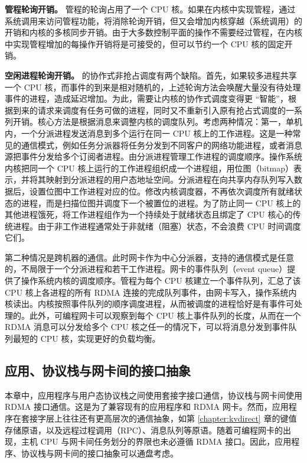 \textbf{管程轮询开销。}
管程的轮询占用了一个 CPU 核。如果在内核中实现管程，通过系统调用来访问管程功能，将消除轮询开销，但又会增加内核穿越（系统调用）的开销和内核的多核同步开销。由于大多数控制平面的操作不需要经过管程，在内核中实现管程增加的每操作开销将是可接受的，但可以节约一个 CPU 核的固定开销。

\textbf{空闲进程轮询开销。}
\libipc{} 的协作式非抢占调度有两个缺陷。首先，如果较多进程共享一个 CPU 核，而事件的到来是相对随机的，上述轮询方法会唤醒大量没有待处理事件的进程，造成延迟增加。为此，需要让内核的协作式调度变得更 ``智能''，根据到来的请求来调度有任务可做的进程，同时又不重新引入原有抢占式调度的一系列开销。核心方法是根据消息来调整内核的调度队列。考虑两种情况：第一，单机内，一个分派进程发送消息到多个运行在同一 CPU 核上的工作进程。这是一种常见的通信模式，例如任务分派器将任务分发到不同客户的网络功能进程，或者消息源把事件分发给多个订阅者进程。由分派进程管理工作进程的调度顺序。操作系统内核把同一个 CPU 核上运行的工作进程组织成一个进程组，用位图（bitmap）表示，并将其映射到分派进程的用户态地址空间。分派进程在向共享内存队列写入数据后，设置位图中工作进程对应的位。修改内核调度器，不再依次调度所有就绪状态的进程，而是扫描位图并调度下一个被置位的进程。为了防止同一 CPU 核上的其他进程饿死，将工作进程组作为一个持续处于就绪状态且绑定了 CPU 核心的传统进程。由于非工作进程通常处于非就绪（阻塞）状态，不会浪费 CPU 时间调度它们。

第二种情况是跨机器的通信。此时网卡作为中心分派器，支持的通信模式是任意的，不局限于一个分派进程和若干工作进程。网卡的事件队列（event queue）提供了操作系统内核的调度顺序。管程为每个 CPU 核建立一个事件队列，汇总了该 CPU 核上各进程的所有 RDMA 连接的完成队列事件，由网卡写入，操作系统内核读出。内核按照事件队列的顺序调度进程，从而被调度的进程恰好是有事件可处理的。此外，可编程网卡可以观察到每个 CPU 核上事件队列的长度，从而在一个 RDMA 消息可以分发给多个 CPU 核之任一的情况下，可以将消息分发到事件队列最短的 CPU 核，实现更好的负载均衡。



\subsection{应用、协议栈与网卡间的接口抽象}
\label{future:nic-interface}

本章中，应用程序与用户态协议栈之间使用套接字接口通信，协议栈与网卡间使用 RDMA 接口通信。这是为了兼容现有的应用程序和 RDMA 网卡。然而，应用程序在套接字层上往往还有更高层次的通信抽象，如第 \ref{chapter:kvdirect} 章的键值存储原语，以及远程过程调用（RPC）、消息队列等原语。随着可编程网卡的出现，主机 CPU 与网卡间任务划分的界限也未必遵循 RDMA 接口。因此，应用程序、协议栈与网卡间的接口抽象可以通盘考虑。

